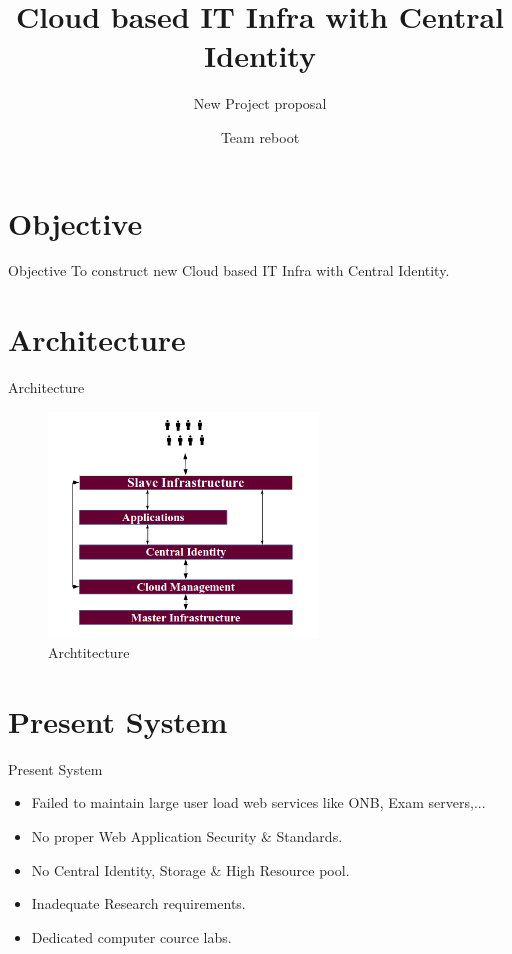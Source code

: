 \documentclass[xcolor=dvipsnames]{beamer}
\title[Cloud based IT Infra with Central Identity]{Cloud based IT Infra with Central Identity}
\subtitle{New Project proposal}
\author{Team reboot}
\institute{Dept. of CSE, RGUKT - Nuzvid}
\begin{document}
\begin{frame}
\titlepage
\end{frame}




\section{Objective}
\begin{frame}{Objective}
To construct new Cloud based IT Infra with Central Identity.
\end{frame}

\section{Architecture}
\begin{frame}{Architecture}
\begin{figure}[H]
 \includegraphics[height=6cm]{./idea.png}
 \caption{Archtitecture \label{fig:idea}}
\end{figure}
\end{frame}


\section{Present System}
\begin{frame}{Present System}

\begin{itemize}
	\item Failed to maintain large user load web services like ONB, Exam servers,...
	\item No proper Web Application Security \& Standards.
	\item No Central Identity, Storage \& High Resource pool.
	\item Inadequate Research requirements.
	\item Dedicated computer cource labs. 
\end{itemize}

\end{frame}
\end{document}
